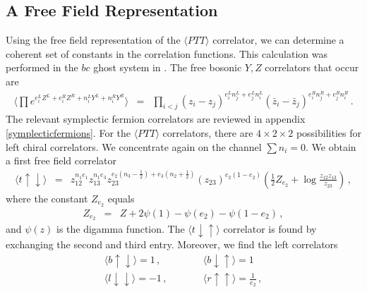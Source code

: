 \documentclass[12pt]{article}
\numberwithin{equation}{section}
\numberwithin{equation}{section}
\numberwithin{table}{section}\setlength{\multlinegap}{25pt}
\begin{document}
\subsection{A Free Field Representation}
Using the free field representation of the $\langle PTT \rangle$  correlator, we can determine a coherent set of constants in the correlation
functions. This calculation was performed in the $bc$ ghost system in \cite{Schomerus:2005bf}.
The  free bosonic $Y,Z$ correlators that occur are
\begin{eqnarray}
\langle \prod e^{e_i^L Z^L + e_i^R Z^R + n_i^L Y^L+ n_i^R Y^R} \rangle
&=& \prod_{i < j} (z_i-z_j)^{e_i^L n_j^L+e_j^L n_i^L} (\bar{z}_i - \bar{z}_j)^{e_i^R n_j^R+e_j^R n_i^R} \, .
\end{eqnarray}
The relevant symplectic fermion correlators are reviewed in appendix \ref{symplecticfermions}.
For the $\langle PTT \rangle$ correlators, there are $4 \times 2 \times 2$ possibilities for left chiral correlators.
We concentrate again on the channel $\sum n_i =0$. We obtain a first free field correlator
\begin{eqnarray}
\langle t \uparrow \downarrow \rangle &=& z_{12}^{n_1 e_1} z_{13}^{n_1 e_3} z_{23}^{e_2(n_3-\frac{1}{2})+e_3(n_2+\frac{1}{2})}
 (z_{23})^{e_2(1-e_2)} (\frac{1}{2} Z_{e_2} + \log \frac{z_{12} z_{13}}{z_{23}}) \, ,
\end{eqnarray}
where the constant $Z_{e_2}$ equals \cite{Kausch:2000fu}
\begin{eqnarray}
Z_{e_2} &=& Z + 2 \psi(1) - \psi(e_2) - \psi(1-e_2) \, ,
\end{eqnarray}
and $\psi(z)$ is the digamma function.
The  $\langle t \downarrow \uparrow \rangle$ correlator is found by exchanging the second and third entry.
Moreover, we find the left correlators 
\begin{eqnarray}
\langle b \uparrow \downarrow \rangle = 1
\, , \qquad
& &
\langle b  \downarrow \uparrow \rangle = 1
\\
\langle l \downarrow \downarrow  \rangle = -1
\, , \qquad
& & 
\langle r \uparrow \uparrow  \rangle = \frac{1}{e_2} \, ,
\end{eqnarray}
\end{document}
